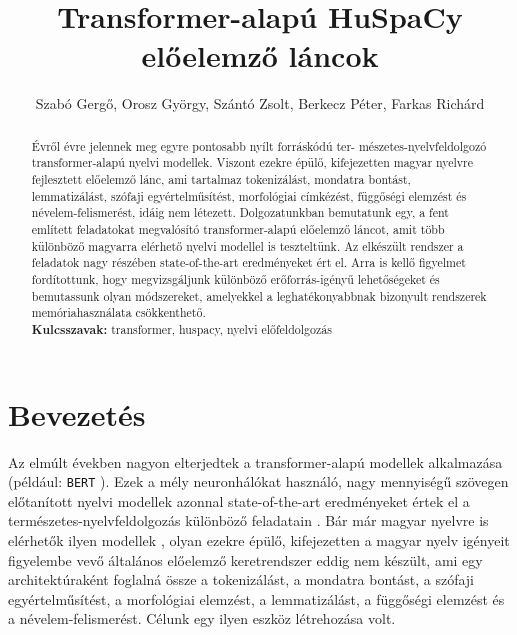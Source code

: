\documentclass{llncs}
\newcommand{\bert}{\texttt{BERT}}
\newcommand{\huspacy}{HuSpaCy}
\newcommand{\trf}{transformer}
\begin{document}
\pagestyle{myheadings}
\def\leftmark{{\rm XVIII. Magyar Számítógépes Nyelvészeti Konferencia}}
\def\rightmark{{\rm Szeged, 2023. január 27-28.}}

\title{Transformer-alapú \huspacy{} előelemző láncok}

\author{
Szabó Gergő,
Orosz György,
Szántó Zsolt, \break
Berkecz Péter,
Farkas Richárd\\
}

\maketitle

\begin{abstract}
Évről évre jelennek meg egyre pontosabb nyílt forráskódú ter-
mészetes-nyelvfeldolgozó \trf{}-alapú nyelvi modellek. Viszont ezekre épülő, kifejezetten magyar nyelvre fejlesztett előelemző lánc, ami tartalmaz tokenizálást, mondatra bontást, lemmatizálást, szófaji egyértelműsítést, morfológiai címkézést, függőségi elemzést és névelem-felismerést, idáig nem létezett. Dolgozatunkban bemutatunk egy, a fent említett feladatokat megvalósító \trf{}-alapú előelemző láncot, amit több különböző magyarra elérhető nyelvi modellel is teszteltünk. Az elkészült rendszer a feladatok nagy részében state-of-the-art eredményeket ért el. Arra is kellő figyelmet fordítottunk, hogy megvizsgáljunk különböző erőforrás-igényű lehetőségeket és bemutassunk olyan módszereket, amelyekkel a leghatékonyabbnak bizonyult rendszerek memóriahasználata csökkenthető. 
\\{\bf Kulcsszavak:} transformer, huspacy, nyelvi előfeldolgozás
\end{abstract}

\section{Bevezetés}

Az elmúlt években nagyon elterjedtek a \trf{}-alapú modellek alkalmazása (például: \bert{} \citep{devlin2018bert}). Ezek a mély neuronhálókat használó, nagy mennyiségű szövegen előtanított nyelvi modellek azonnal state-of-the-art eredményeket értek el a természetes-nyelvfeldolgozás különböző feladatain \citep{devlin2018bert}. Bár már magyar nyelvre is elérhetők ilyen modellek \citep{Nemeskey:2021a} \citep{conneau2019unsupervised}, olyan ezekre épülő, kifejezetten a magyar nyelv igényeit figyelembe vevő általános előelemző keretrendszer eddig nem készült, ami egy architektúraként foglalná össze a tokenizálást, a mondatra bontást, a szófaji egyértelműsítést, a morfológiai elemzést, a lemmatizálást, a függőségi elemzést és a névelem-felismerést. Célunk egy ilyen eszköz létrehozása volt.
\end{document}
